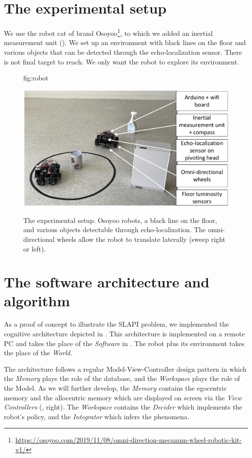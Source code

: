 \documentclass[pmlr]{jmlr}%
\begin{document}
\section{The experimental setup}
\label{sec:experiment}

We use the robot cat of brand Osoyoo\footnote{\url{https://osoyoo.com/2019/11/08/omni-direction-mecanum-wheel-robotic-kit-v1/}}, to which we added an inertial measurement unit (). 
We set up an environment with black lines on the floor and various objects that can be detected through the echo-localization sensor. 
There is not final target to reach. We only want the robot to explore its environment. 

\begin{figure}[htbp]
	\floatconts
	{fig:robot}
	{\caption{The experimental setup. 
			Osoyoo robots, a black line on the floor, and various objects detectable through echo-localization.
		    The omni-directional wheels allow the robot to translate laterally (sweep right or left).}}
	{\includegraphics[width=0.8\linewidth]{images/Figure_1_Robotb}}
\end{figure}


\section{The software architecture and algorithm}
\label{sec:software}

As a proof of concept to illustrate the SLAPI problem, we implemented the cognitive architecture depicted in . 
This architecture is implemented on a remote PC and takes the place of the \textit{Software} in . The robot plus its environment takes the place of the \textit{World}.

The architecture follows a regular Model-View-Controller design pattern in which the \textit{Memory} plays the role of the database, and the \textit{Workspace} plays the role of the Model. 
As we will further develop, the \textit{Memory} contains the egocentric memory and the allocentric memory which are displayed on screen via the \textit{View Controllers} (, right).
The \textit{Workspace} contains the \textit{Decider} which implements the robot's policy, and the \textit{Integrator} which infers the phenomena. 
\end{document}
